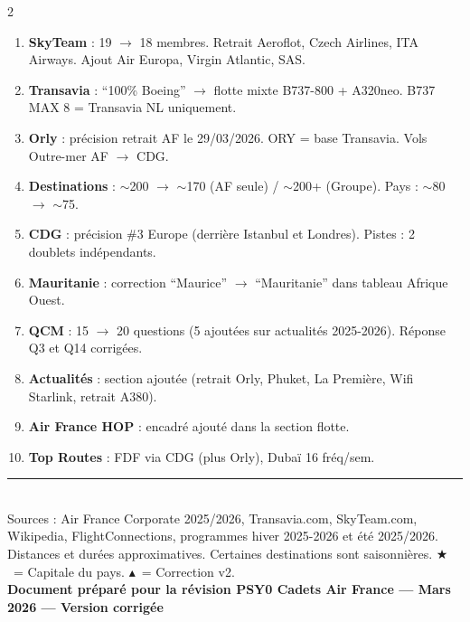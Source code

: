 \documentclass[9pt,a4paper,landscape]{article}
\newcommand{\CAP}{\textcolor{capgold}{$\bigstar$}}
\newcommand{\CORR}{\textcolor{afred}{$\blacktriangle$}}
\begin{document}
\vspace{0.3cm}
\begin{tcolorbox}[colback=afred!5,colframe=afred,title={\textbf{CHANGELOG --- CORRECTIONS APPORTÉES (v2 --- Mars 2026)}},fonttitle=\bfseries\color{white}]
\scriptsize
\begin{multicols}{2}
\begin{enumerate}[leftmargin=*]\setlength\itemsep{1pt}
\item \textbf{SkyTeam} : 19 $\rightarrow$ 18 membres. Retrait Aeroflot, Czech Airlines, ITA Airways. Ajout Air Europa, Virgin Atlantic, SAS.
\item \textbf{Transavia} : ``100\% Boeing'' $\rightarrow$ flotte mixte B737-800 + A320neo. B737 MAX 8 = Transavia NL uniquement.
\item \textbf{Orly} : précision retrait AF le 29/03/2026. ORY = base Transavia. Vols Outre-mer AF $\rightarrow$ CDG.
\item \textbf{Destinations} : $\sim$200 $\rightarrow$ $\sim$170 (AF seule) / $\sim$200+ (Groupe). Pays : $\sim$80 $\rightarrow$ $\sim$75.
\item \textbf{CDG} : précision \#3 Europe (derrière Istanbul et Londres). Pistes : 2 doublets indépendants.
\item \textbf{Mauritanie} : correction ``Maurice'' $\rightarrow$ ``Mauritanie'' dans tableau Afrique Ouest.
\item \textbf{QCM} : 15 $\rightarrow$ 20 questions (5 ajoutées sur actualités 2025-2026). Réponse Q3 et Q14 corrigées.
\item \textbf{Actualités} : section ajoutée (retrait Orly, Phuket, La Première, Wifi Starlink, retrait A380).
\item \textbf{Air France HOP} : encadré ajouté dans la section flotte.
\item \textbf{Top Routes} : FDF via CDG (plus Orly), Dubaï 16 fréq/sem.
\end{enumerate}
\end{multicols}
\end{tcolorbox}

\vfill
\begin{center}
\rule{0.6\textwidth}{0.5pt}\\[0.15cm]
{\scriptsize Sources : Air France Corporate 2025/2026, Transavia.com, SkyTeam.com, Wikipedia, FlightConnections, programmes hiver 2025-2026 et été 2025/2026.}\\
{\scriptsize Distances et durées approximatives. Certaines destinations sont saisonnières. \CAP\ = Capitale du pays. \CORR\ = Correction v2.}\\[0.15cm]
{\small\textbf{Document préparé pour la révision PSY0 Cadets Air France --- Mars 2026 --- Version corrigée}}
\end{center}
\end{document}
